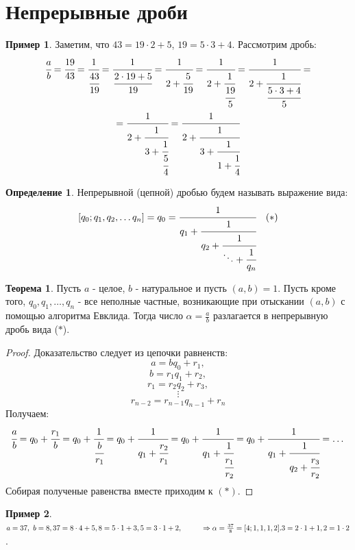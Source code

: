 \documentclass[a4paper, 12pt]{article}
\newcommand\tab[1][.5cm]{\hspace*{#1}}
\theoremstyle{definition}
\newtheorem{definition}{Определение}[section]
\newtheorem{theorem}{Теорема}[section]
\newtheorem*{example}{Пример}
\begin{document}
    \section{Непрерывные дроби}
    \begin{example}
        Заметим, что  $43=19\cdot 2+5$, $19=5\cdot 3+4$. Рассмотрим дробь:
        \begin{multline*}
            \cfrac{a}{b}=\cfrac{19}{43}=\cfrac{1}{\cfrac{43}{19}}=\cfrac{1}{\cfrac{2\cdot 19+5}{19}}=\cfrac{1}{2+\cfrac{5}{19}}=\cfrac{1}{2+\cfrac{1}{\cfrac{19}{5}}}=\cfrac{1}{2+\cfrac{1}{\cfrac{5\cdot 3+4}{5}}}=\\
            =\cfrac{1}{2+\cfrac{1}{3+\cfrac{1}{\cfrac{5}{4}}}}=\cfrac{1}{2+\cfrac{1}{3+\cfrac{1}{1+\cfrac{1}{4}}}}
        \end{multline*}
    \end{example}
    \begin{definition}
        Непрерывной (цепной) дробью будем называть выражение вида:
        \[[q_0; q_1, q_2, \dots q_n] = q_0=\cfrac{1}{q_1+\cfrac{1}{q_2+\cfrac{1}{\ddots+\cfrac{1}{q_n}}}}\ \ \ (\ast)\]
    \end{definition}
    \begin{theorem} \label{th7.1}
        Пусть $a$ - целое, $b$ - натуральное и пусть $(a,b)=1$. Пусть кроме того, $q_0, q_1,\dots, q_n$ - все неполные частные, возникающие при отыскании $(a,b)$ с помощью алгоритма Евклида. Тогда число $\alpha=\frac{a}{b}$ разлагается в непрерывную дробь вида ($\ast$).
    \end{theorem} 
    \begin{proof}
        Доказательство следует из цепочки равненств:\\
        \[a=bq_0+r_1,\]
        \[b=r_1q_1+r_2,\]
        \[r_1=r_2q_2+r_3,\]
        \[\vdots\]
        \[r_{n-2}=r_{n-1}q_{n-1}+r_n\]
        Получаем:
        \begin{equation*}
            \cfrac{a}{b}=q_0+\cfrac{r_1}{b}=q_0+\cfrac{1}{\cfrac{b}{r_1}}=q_0+\cfrac{1}{q_1+\cfrac{r_2}{r_1}}=q_0+\cfrac{1}{q_1+\cfrac{1}{\cfrac{r_1}{r_2}}}=q_0+\cfrac{1}{q_1+\cfrac{1}{q_2+\cfrac{r_3}{r_2}}}=\dots
        \end{equation*}
        Собирая полученые равенства вместе приходим к $(\ast)$.
    \end{proof}
    \begin{example}\tab \\
        $a=37,\ b=8,\\
        37=8\cdot 4+5,\\
        8=5\cdot 1+3,\\
        5=3\cdot 1+2, \tab[1cm] \Rightarrow \alpha=\frac{37}{8}=[4;1,1,1,2].\\
        3=2\cdot 1+1,\\
        2=1\cdot 2$.
    \end{example}
\end{document}
